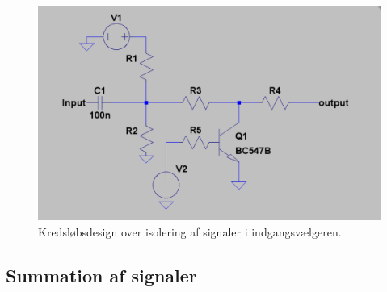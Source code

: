 \begin{figure}[h]
\centering
\includegraphics[scale=0.2]{implementering/indgangsvaelger/signal-taend-sluk.png}
\caption{Kredsløbsdesign over isolering af signaler i indgangsvælgeren.}
\label{indgangsvaelger-isolering}
\end{figure}




\subsection*{Summation af signaler}




